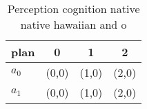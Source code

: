 \documentclass[a4paper]{article}
\begin{document}
\begin{table}
\begin{adjustbox}{width=0.6\columnwidth}
\begin{tabular}{|l|l|l|l|}
\hline
\textbf{plan} & \multicolumn{1}{c|}{\textbf{0}} & \multicolumn{1}{c|}{\textbf{1}} & \multicolumn{1}{c|}{\textbf{2}} \\ \hline
\textbf{$a_0$}  & (0,0) & (1,0) & (2,0) \\ \hline
\textbf{$a_1$}  & (0,0) & (1,0) & (2,0) \\ \hline
\end{tabular}
\end{adjustbox}
\caption{Perception cognition native native hawaiian and o
}
\end{table}
\end{document}
